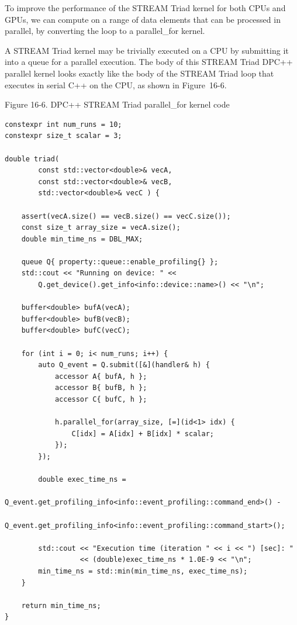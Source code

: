 To improve the performance of the STREAM Triad kernel for both CPUs and GPUs, we can compute on a range of data elements that can be processed in parallel, by converting the loop to a parallel\_for kernel.\par

A STREAM Triad kernel may be trivially executed on a CPU by submitting it into a queue for a parallel execution. The body of this STREAM Triad DPC++ parallel kernel looks exactly like the body of the STREAM Triad loop that executes in serial C++ on the CPU, as shown in Figure 16-6.\par

\hspace*{\fill} \par %
Figure 16-6. DPC++ STREAM Triad parallel\_for kernel code
\begin{lstlisting}[caption={}]
constexpr int num_runs = 10;
constexpr size_t scalar = 3;

double triad(
		const std::vector<double>& vecA,
		const std::vector<double>& vecB,
		std::vector<double>& vecC ) {
			
	assert(vecA.size() == vecB.size() == vecC.size());
	const size_t array_size = vecA.size();
	double min_time_ns = DBL_MAX;
	
	queue Q{ property::queue::enable_profiling{} };
	std::cout << "Running on device: " <<
		Q.get_device().get_info<info::device::name>() << "\n";
	
	buffer<double> bufA(vecA);
	buffer<double> bufB(vecB);
	buffer<double> bufC(vecC);
	
	for (int i = 0; i< num_runs; i++) {
		auto Q_event = Q.submit([&](handler& h) {
			accessor A{ bufA, h };
			accessor B{ bufB, h };
			accessor C{ bufC, h };
			
			h.parallel_for(array_size, [=](id<1> idx) {
				C[idx] = A[idx] + B[idx] * scalar;
			});
		});
	
		double exec_time_ns =
			Q_event.get_profiling_info<info::event_profiling::command_end>() -
			Q_event.get_profiling_info<info::event_profiling::command_start>();
		
		std::cout << "Execution time (iteration " << i << ") [sec]: "
				  << (double)exec_time_ns * 1.0E-9 << "\n";
		min_time_ns = std::min(min_time_ns, exec_time_ns);
	}

	return min_time_ns;
}
\end{lstlisting}

